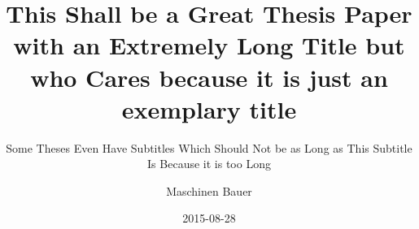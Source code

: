 \title{This Shall be a Great Thesis Paper with an Extremely Long Title but who Cares because it is just an exemplary title}
\subtitle{Some Theses Even Have Subtitles Which Should Not be as Long as This Subtitle Is Because it is too Long}
\author{Maschinen Bauer}
\date{2015-08-28}

\usepackage{lipsum}
